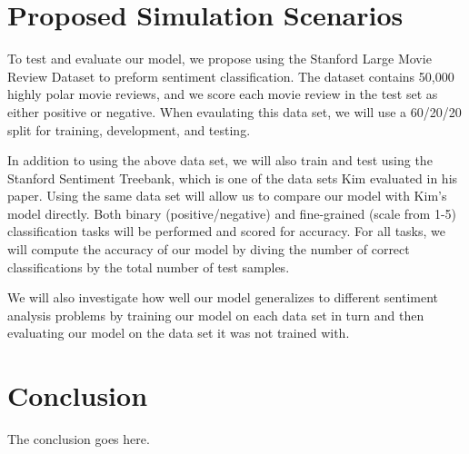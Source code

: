 \documentclass[conference]{IEEEtran}
\begin{document}
\section{Proposed Simulation Scenarios}
      To test and evaluate our model, we propose using the Stanford Large Movie Review 
      Dataset to preform sentiment classification. The dataset contains 50,000 highly polar
      movie reviews, and we score each movie review in the test set as either positive or 
      negative. When evaulating this data set, we will use a 60/20/20 split for training,
      development, and testing\cite{maas-EtAl:2011:ACL-HLT2011}.
      
      In addition to using the above data set, we will also train and test using the Stanford Sentiment 
      Treebank, which is one of the data sets Kim evaluated in his paper. Using the same data set
      will allow us to compare our model with Kim's model directly. Both binary (positive/negative)
      and fine-grained (scale from 1-5) classification tasks will be performed and scored for accuracy.
      For all tasks, we will compute the accuracy of our model by diving the number of correct classifications
      by the total number of test samples\cite{sentimenttreebank}.

      We will also investigate how well our model generalizes to different sentiment analysis problems 
      by training our model on each data set in turn and then evaluating our model on the data set it
      was not trained with.
\section{Conclusion}
The conclusion goes here.



\end{document}
